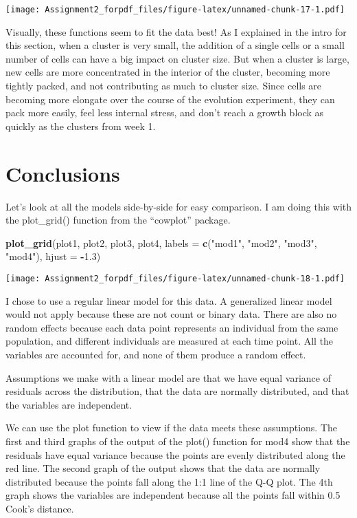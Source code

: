 \documentclass[]{article}
\newenvironment{Shaded}{\begin{snugshade}}{\end{snugshade}}
\newcommand{\KeywordTok}[1]{\textcolor[rgb]{0.13,0.29,0.53}{\textbf{#1}}}
\newcommand{\DataTypeTok}[1]{\textcolor[rgb]{0.13,0.29,0.53}{#1}}
\newcommand{\FloatTok}[1]{\textcolor[rgb]{0.00,0.00,0.81}{#1}}
\newcommand{\StringTok}[1]{\textcolor[rgb]{0.31,0.60,0.02}{#1}}
\newcommand{\OperatorTok}[1]{\textcolor[rgb]{0.81,0.36,0.00}{\textbf{#1}}}
\newcommand{\NormalTok}[1]{#1}
\begin{document}
\texttt{[image: Assignment2\_forpdf\_files/figure-latex/unnamed-chunk-17-1.pdf]}

Visually, these functions seem to fit the data best! As I explained in
the intro for this section, when a cluster is very small, the addition
of a single cells or a small number of cells can have a big impact on
cluster size. But when a cluster is large, new cells are more
concentrated in the interior of the cluster, becoming more tightly
packed, and not contributing as much to cluster size. Since cells are
becoming more elongate over the course of the evolution experiment, they
can pack more easily, feel less internal stress, and don't reach a
growth block as quickly as the clusters from week 1.

\section{Conclusions}\label{conclusions}

Let's look at all the models side-by-side for easy comparison. I am
doing this with the plot\_grid() function from the ``cowplot'' package.

\begin{Shaded}
\begin{Highlighting}[]
\KeywordTok{plot_grid}\NormalTok{(plot1, plot2, plot3, plot4, }\DataTypeTok{labels =} \KeywordTok{c}\NormalTok{(}\StringTok{"mod1"}\NormalTok{, }\StringTok{"mod2"}\NormalTok{, }\StringTok{"mod3"}\NormalTok{, }\StringTok{"mod4"}\NormalTok{), }\DataTypeTok{hjust =} \OperatorTok{-}\FloatTok{1.3}\NormalTok{)}
\end{Highlighting}
\end{Shaded}

\texttt{[image: Assignment2\_forpdf\_files/figure-latex/unnamed-chunk-18-1.pdf]}

I chose to use a regular linear model for this data. A generalized
linear model would not apply because these are not count or binary data.
There are also no random effects because each data point represents an
individual from the same population, and different individuals are
measured at each time point. All the variables are accounted for, and
none of them produce a random effect.

Assumptions we make with a linear model are that we have equal variance
of residuals across the distribution, that the data are normally
distributed, and that the variables are independent.

We can use the plot function to view if the data meets these
assumptions. The first and third graphs of the output of the plot()
function for mod4 show that the residuals have equal variance because
the points are evenly distributed along the red line. The second graph
of the output shows that the data are normally distributed because the
points fall along the 1:1 line of the Q-Q plot. The 4th graph shows the
variables are independent because all the points fall within 0.5 Cook's
distance.
\end{document}
